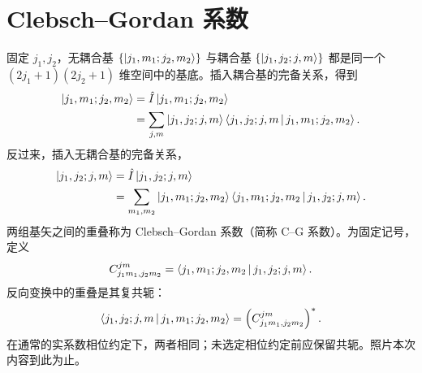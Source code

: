 \section{Clebsch--Gordan 系数}
固定 $j_1,j_2$，无耦合基 $\left\{\Ket{j_1,m_1;j_2,m_2}\right\}$ 与耦合基
$\left\{\Ket{j_1,j_2;j,m}\right\}$ 都是同一个
$\left(2j_1+1\right)\left(2j_2+1\right)$ 维空间中的基底。插入耦合基的完备关系，得到
\begin{align}
\Ket{j_1,m_1;j_2,m_2}
&=\hat I\Ket{j_1,m_1;j_2,m_2}\notag\\
&=\sum_{j,m}\Ket{j_1,j_2;j,m}
\Braket{j_1,j_2;j,m|j_1,m_1;j_2,m_2}.
\end{align}
反过来，插入无耦合基的完备关系，
\begin{align}
\Ket{j_1,j_2;j,m}
&=\hat I\Ket{j_1,j_2;j,m}\notag\\
&=\sum_{m_1,m_2}\Ket{j_1,m_1;j_2,m_2}
\Braket{j_1,m_1;j_2,m_2|j_1,j_2;j,m}.
\end{align}
两组基矢之间的重叠称为 Clebsch--Gordan 系数（简称 C--G 系数）。为固定记号，定义
\begin{equation}
C_{j_1m_1,j_2m_2}^{jm}
=\Braket{j_1,m_1;j_2,m_2|j_1,j_2;j,m}.
\end{equation}
反向变换中的重叠是其复共轭：
\begin{equation}
\Braket{j_1,j_2;j,m|j_1,m_1;j_2,m_2}
=\left(C_{j_1m_1,j_2m_2}^{jm}\right)^*.
\end{equation}
在通常的实系数相位约定下，两者相同；未选定相位约定前应保留共轭。照片本次内容到此为止。
